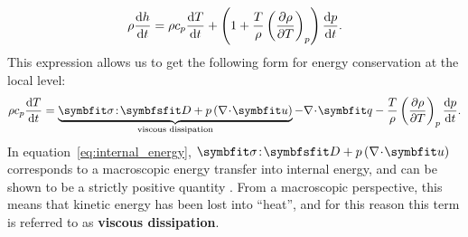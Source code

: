 \begin{equation}
\rho\frac{\mathrm d h}{\mathrm d t} = \rho c_p \frac{\mathrm d T}{\mathrm d t} + \left( 1 + \frac{T}{\rho} \left( \frac{\partial \rho}{\partial T}\right)_p\right) \frac{\mathrm d p}{\mathrm d t}.
\end{equation}
This expression allows us to get the following form for energy conservation at the local level:
\begin{equation}
\rho c_p \dd{T}{t} = \underbrace{\symbfit\sigma \!:\! \symbfsfit D + p \lp\nabla\!\cdot\!\bu\rp}_\text{viscous dissipation} - \nabla\!\cdot\!\bq - \frac{T}{\rho} \lp \pd{\rho}{T}\rp_p \dd{p}{t}.
\label{eq:energy_equation_general_form}
\end{equation}
In equation~\eqref{eq:internal_energy}, $\symbfit\sigma \!:\! \symbfsfit D + p \lp\nabla\!\cdot\!\bu\rp$ corresponds to a macroscopic energy transfer into internal energy, and can be shown to be a strictly positive quantity \citep[e.g.][]{Leal2007}. From a macroscopic perspective, this means that kinetic energy has been lost into ``heat'', and for this reason this term is referred to as \textbf{viscous dissipation}. 

